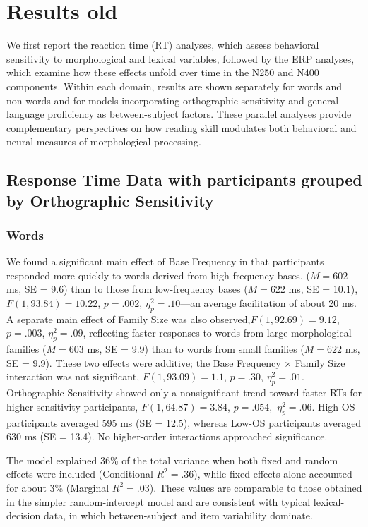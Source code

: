 \section{Results old}

We first report the reaction time (RT) analyses, which assess behavioral sensitivity to morphological and lexical variables, followed by the ERP analyses, which examine how these effects unfold over time in the N250 and N400 components. Within each domain, results are shown separately for words and non-words and for models incorporating orthographic sensitivity and general language proficiency as between-subject factors. These parallel analyses provide complementary perspectives on how reading skill modulates both behavioral and neural measures of morphological processing.

\subsection{Response Time Data with participants grouped by Orthographic Sensitivity}
		
	\subsubsection{Words} 
		
		We found a significant main effect of Base Frequency in that participants responded more quickly to words derived from high-frequency bases, ($M = 602$ ms, SE = 9.6) than to those from low-frequency bases ($M = 622$ ms, SE = 10.1), $F(1, 93.84) = 10.22$, $p = .002$, $\eta_p^2 = .10$—an average facilitation of about 20 ms. A separate main effect of Family Size was also observed,$ F(1, 92.69) = 9.12$, $p = .003$, $\eta_p^2 = .09$, reflecting faster responses to words from large morphological families ($M = 603$ ms, SE = 9.9) than to words from small families ($M = 622$ ms, SE = 9.9). These two effects were additive; the Base Frequency × Family Size interaction was not significant, $F(1, 93.09) = 1.1$, $p = .30$, $\eta_p^2 = .01$. Orthographic Sensitivity showed only a nonsignificant trend toward faster RTs for higher-sensitivity participants, $F(1, 64.87) = 3.84$, $p = .054,$ $\eta_p^2 = .06$. High-OS participants averaged 595 ms (SE = 12.5), whereas Low-OS participants averaged 630 ms (SE = 13.4). No higher-order interactions approached significance. 
			
		The model explained 36\% of the total variance when both fixed and random effects were included (Conditional $R^2 = .36$), while fixed effects alone accounted for about 3\% (Marginal $R^2 = .03$). These values are comparable to those obtained in the simpler random‐intercept model and are consistent with typical lexical‐decision data, in which between‐subject and item variability dominate.
		

